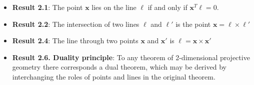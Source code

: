 \documentclass{report}
\begin{document}
    \pagebreak 
    \begin{itemize}
        \item \textbf{Result 2.1}: The point $\mathbf{x}$ lies on the line $\mathbf{\ell}$ if and only if $\mathbf{x}^{T}\ell = 0$.
        \item \textbf{Result 2.2}: The intersection of two lines $\mathbf{\ell}$ and $\ell'$ is the point $\mathbf{x}=\ell\times \ell'$
        \item \textbf{Result 2.4}: The line through two points $\mathbf{x}$ and $\mathbf{x}'$ is $\mathbf{\ell}=\mathbf{x}\times \mathbf{x}'$
        \item \textbf{Result 2.6. Duality principle}: To any theorem of 2-dimensional projective geometry there corresponds a dual theorem, which may be derived by interchanging the roles of points and lines in the original theorem.

    \end{itemize}





    
\end{document}

